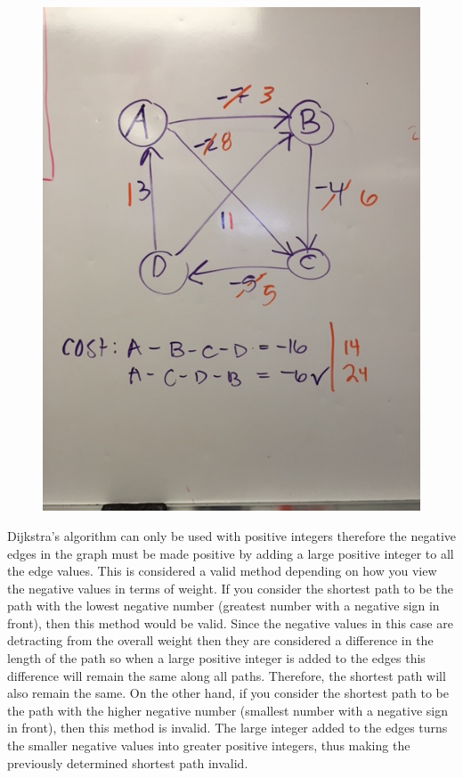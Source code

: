 \documentclass[a4paper]{article}
\begin{document}
\begin{figure}[h]
\centering
\includegraphics[width=.9\textwidth]{48.JPG}
\end{figure}

Dijkstra's algorithm can only be used with positive integers therefore the negative edges in the graph must be made positive by adding a large positive integer to all the edge values. This is considered a valid method depending on how you view the negative values in terms of weight. If you consider the shortest path to be the path with the lowest negative number (greatest number with a negative sign in front), then this method would be valid. Since the negative values in this case are detracting from the overall weight then they are considered a difference in the length of the path so when a large positive integer is added to the edges this difference will remain the same along all paths. Therefore, the shortest path will also remain the same. On the other hand, if you consider the shortest path to be the path with the higher negative number (smallest number with a negative sign in front), then this method is invalid. The large integer added to the edges turns the smaller negative values into greater positive integers, thus making the previously determined shortest path invalid.  
\end{document}
